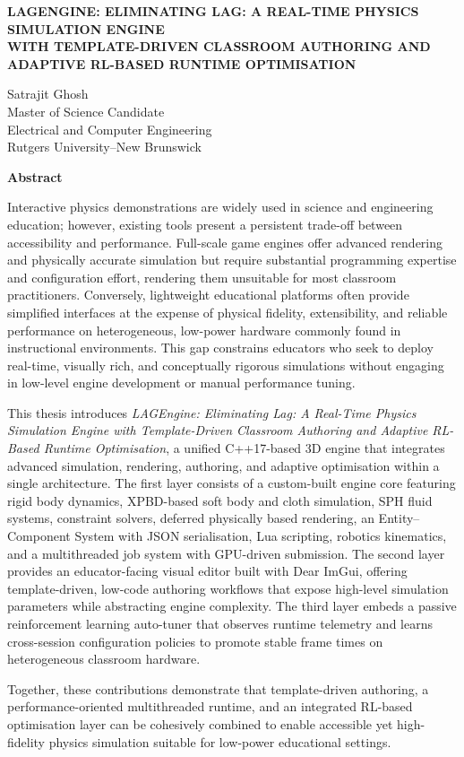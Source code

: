 \documentclass[10pt]{article}
\begin{document}
\begin{center}
\textbf{\Large LAGENGINE: ELIMINATING LAG: A REAL-TIME PHYSICS SIMULATION ENGINE}\\
\vspace{0.2em}
\textbf{\Large WITH TEMPLATE-DRIVEN CLASSROOM AUTHORING AND}\\
\vspace{0.2em}
\textbf{\Large ADAPTIVE RL-BASED RUNTIME OPTIMISATION}

\vspace{1em}
Satrajit Ghosh\\
Master of Science Candidate\\
Electrical and Computer Engineering\\
Rutgers University--New Brunswick

\vspace{1em}
\textbf{Abstract}
\end{center}

Interactive physics demonstrations are widely used in science and engineering education; however, existing tools present a persistent trade-off between accessibility and performance. Full-scale game engines offer advanced rendering and physically accurate simulation but require substantial programming expertise and configuration effort, rendering them unsuitable for most classroom practitioners. Conversely, lightweight educational platforms often provide simplified interfaces at the expense of physical fidelity, extensibility, and reliable performance on heterogeneous, low-power hardware commonly found in instructional environments. This gap constrains educators who seek to deploy real-time, visually rich, and conceptually rigorous simulations without engaging in low-level engine development or manual performance tuning.

This thesis introduces \textit{LAGEngine: Eliminating Lag: A Real-Time Physics Simulation Engine with Template-Driven Classroom Authoring and Adaptive RL-Based Runtime Optimisation}, a unified C++17-based 3D engine that integrates advanced simulation, rendering, authoring, and adaptive optimisation within a single architecture. The first layer consists of a custom-built engine core featuring rigid body dynamics, XPBD-based soft body and cloth simulation, SPH fluid systems, constraint solvers, deferred physically based rendering, an Entity--Component System with JSON serialisation, Lua scripting, robotics kinematics, and a multithreaded job system with GPU-driven submission. The second layer provides an educator-facing visual editor built with Dear ImGui, offering template-driven, low-code authoring workflows that expose high-level simulation parameters while abstracting engine complexity. The third layer embeds a passive reinforcement learning auto-tuner that observes runtime telemetry and learns cross-session configuration policies to promote stable frame times on heterogeneous classroom hardware.

Together, these contributions demonstrate that template-driven authoring, a performance-oriented multithreaded runtime, and an integrated RL-based optimisation layer can be cohesively combined to enable accessible yet high-fidelity physics simulation suitable for low-power educational settings.
\end{document}
